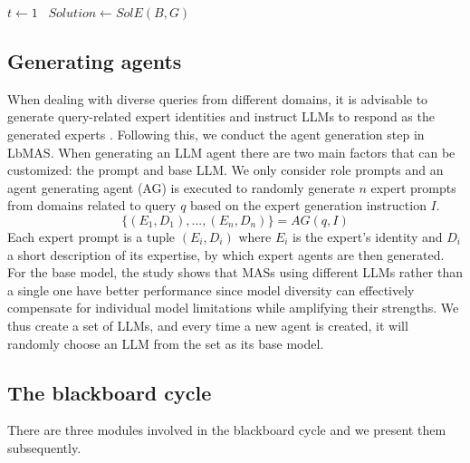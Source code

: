 \documentclass[11pt]{article}
\begin{document}
\begin{algorithm}
\caption{Algorithm of bMAS}\label{alg:bMAS}
$t \gets 1$\ 
$Solution \gets SolE(B, G)$
\end{algorithm}

\subsection{Generating agents}
When dealing with diverse queries from different domains, it is advisable to generate query-related expert identities and instruct LLMs to respond as the generated experts \citep{long-etal-2024-multiexpertprompting,xu2025expertpromptinginstructinglargelanguage}. Following this, we conduct the agent generation step in LbMAS. When generating an LLM agent there are two main factors that can be customized: the prompt and base LLM. We only consider role prompts and an agent generating agent (AG) is executed to randomly generate $n$ expert prompts from domains related to query $q$ based on the expert generation instruction $I$.
\begin{equation}
\{(E_1, D_1),...,(E_n, D_n) \} = AG(q, I) \label{ag}   
\end{equation}
Each expert prompt is a tuple $(E_i,D_i)$ where $E_i$ is the expert’s identity and $D_i$ a short description of its expertise, by which expert agents are then generated. For the base model, the study \citep{zhang_if_2025} shows that MASs using different LLMs rather than a single one have better performance since model diversity can effectively compensate for individual model limitations while amplifying their strengths. We thus create a set of LLMs, and every time a new agent is created, it will randomly choose an LLM from the set as its base model.
\subsection{The blackboard cycle}
There are three modules involved in the blackboard cycle and we present them subsequently.
\end{document}
